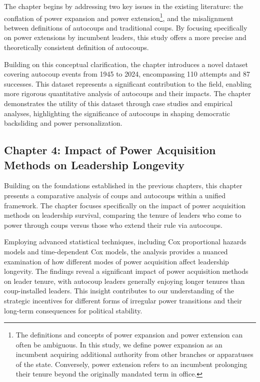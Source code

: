 \documentclass[
  12pt,
]{report}
\begin{document}
The chapter begins by addressing two key issues in the existing
literature: the conflation of power expansion and power
extension\footnote{The definitions and concepts of power expansion and
  power extension can often be ambiguous. In this study, we define power
  expansion as an incumbent acquiring additional authority from other
  branches or apparatuses of the state. Conversely, power extension
  refers to an incumbent prolonging their tenure beyond the originally
  mandated term in office.}, and the misalignment between definitions of
autocoups and traditional coups. By focusing specifically on power
extensions by incumbent leaders, this study offers a more precise and
theoretically consistent definition of autocoups.

Building on this conceptual clarification, the chapter introduces a
novel dataset covering autocoup events from 1945 to 2024, encompassing
110 attempts and 87 successes. This dataset represents a significant
contribution to the field, enabling more rigorous quantitative analysis
of autocoups and their impacts. The chapter demonstrates the utility of
this dataset through case studies and empirical analyses, highlighting
the significance of autocoups in shaping democratic backsliding and
power personalization.

\subsection*{Chapter 4: Impact of Power Acquisition Methods on
Leadership
Longevity}\label{chapter-4-impact-of-power-acquisition-methods-on-leadership-longevity}

Building on the foundations established in the previous chapters, this
chapter presents a comparative analysis of coups and autocoups within a
unified framework. The chapter focuses specifically on the impact of
power acquisition methods on leadership survival, comparing the tenure
of leaders who come to power through coups versus those who extend their
rule via autocoups.

Employing advanced statistical techniques, including Cox proportional
hazards models and time-dependent Cox models, the analysis provides a
nuanced examination of how different modes of power acquisition affect
leadership longevity. The findings reveal a significant impact of power
acquisition methods on leader tenure, with autocoup leaders generally
enjoying longer tenures than coup-installed leaders. This insight
contributes to our understanding of the strategic incentives for
different forms of irregular power transitions and their long-term
consequences for political stability.
\end{document}
